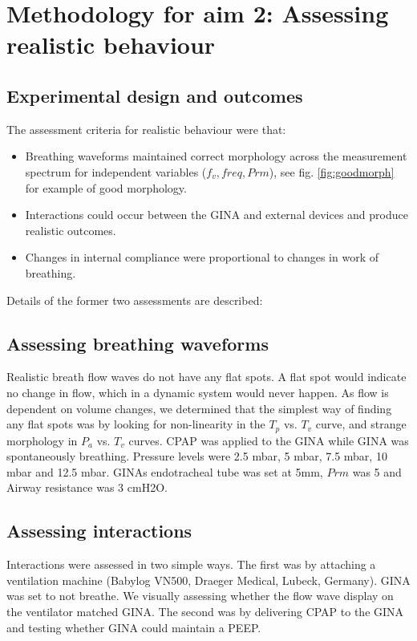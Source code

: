 \documentclass[12pt, openany, oneside]{book}
\begin{document}
\section{Methodology for aim 2: Assessing realistic behaviour}

\subsection{Experimental design and outcomes}

The assessment criteria for realistic behaviour were that:
\begin{itemize}
\item Breathing waveforms maintained correct morphology across the measurement spectrum for independent variables ($f_v, freq, Prm$), see fig. \ref{fig:goodmorph} for example of good morphology.
\item Interactions could occur between the GINA and external devices and produce realistic outcomes.
\item Changes in internal compliance were proportional to changes in work of breathing.
\end{itemize}

Details of the former two assessments are described:

\subsection{Assessing breathing waveforms}
Realistic breath flow waves do not have any flat spots. A flat spot would indicate no change in flow, which in a dynamic system would never happen. As flow is dependent on volume changes, we determined that the simplest way of finding any flat spots was by looking for non-linearity in the $T_p$ vs. $T_v$ curve, and strange morphology in $P_a$ vs. $T_v$ curves. CPAP was applied to the GINA while GINA was spontaneously breathing. Pressure levels were 2.5 mbar, 5 mbar, 7.5 mbar, 10 mbar and 12.5 mbar. GINAs endotracheal tube was set at 5mm, $Prm$ was 5 and Airway resistance was 3 cmH2O. 

\subsection{Assessing interactions}
Interactions were assessed in two simple ways. The first was by attaching a ventilation machine (Babylog VN500, Draeger Medical, Lubeck, Germany). GINA was set to not breathe. We visually assessing whether the flow wave display on the ventilator matched GINA. The second was by delivering CPAP to the GINA and testing whether GINA could maintain a PEEP.
\end{document}
